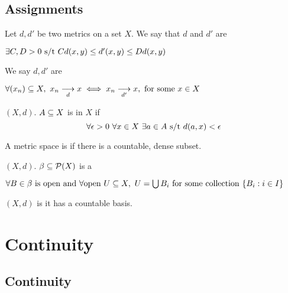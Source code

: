 \documentclass[12pt]{article}
\begin{document}
\subsection{Assignments}


\bboxdefn
\begin{defn}
    Let \(d,d'\) be two metrics on a set \(X\).
    We say that \(d\) and \(d'\) are  

    \(\exists C,D>0\text{ s/t } Cd(x,y)\le d'(x,y)\le Dd(x,y)\)
\end{defn}
\ebox

\bboxdefn
\begin{defn}
    We say \(d,d'\) are  

    \(\forall (x_n)\subseteq X,\ x_n\underset{d}\longrightarrow x\iff
    x_n\underset{d'}\longrightarrow x,\ \TR{for\ some}\ x\in X\)
\end{defn}
\ebox

\bboxdefn
\begin{defn}[Dense]
    \((X,d)\). \(A\subseteq X\) is  in \(X\) if 
    \[
        \forall\epsilon>0\ \forall x\in X\ \exists a\in A
        \text{ s/t } d(a,x)<\epsilon
    \]
\end{defn}
\ebox


\bboxdefn
\begin{defn}[Seperable]
    A metric space is  if there is a countable, dense subset.
\end{defn}
\ebox

\bboxdefn
\begin{defn}[Basis]
    \((X,d)\). \(\beta\subseteq\mathcal P(X)\) is a  
    
    \(\forall B\in\beta\ \is\ \TR{open\ and}\ 
    \forall \TR{open}\ U\ssq X,\ U=\bigunin B_i\ \TR{for\ some\ collection}\ \{B_i:i\in I\}\)
\end{defn}
\ebox

\bboxdefn
\begin{defn}
    \((X,d)\) is   it has a countable basis.
\end{defn}
\ebox



\section{Continuity}
\subsection{Continuity}
\end{document}
